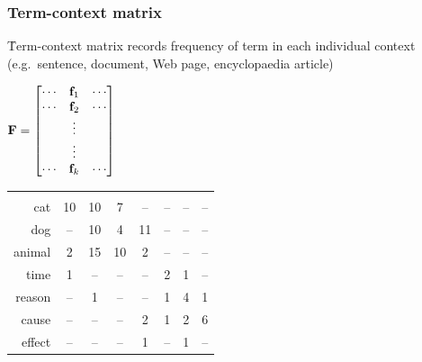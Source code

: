 \documentclass[t]{beamer} %
\begin{document}
\begin{frame}
  \frametitle{Term-context matrix}

  \h{Term-context matrix} records frequency of term in each individual context (e.g.\ sentence, document, Web page, encyclopaedia article)
  
  \gap[3]
  \begin{center}
  \(
  \mathbf{F} = 
  \begin{bmatrix}
    \cdots & \vf_1 & \cdots \\
    \cdots & \vf_2 & \cdots \\
    & \vdots & \\
    & \vdots & \\
    \cdots & \vf_k & \cdots \\
  \end{bmatrix}
  \)
  \hspace{5mm}
  \begin{small}
    \setlength{\arrayrulewidth}{1pt}
    \begin{tabular}[c]{r*{7}{|c}|}
      & 
      & 
      & 
      & 
      & 
      & 
      &  \\
      cat      &      10 &  10 &     7 &    -- &         -- &   -- &        -- \\
      dog      &      -- &  10 &     4 &    11 &         -- &   -- &        -- \\
      animal   &       2 &  15 &    10 &     2 &         -- &   -- &        -- \\
      time     &       1 &  -- &    -- &    -- &          2 &    1 &        -- \\
      reason   &      -- &   1 &    -- &    -- &          1 &    4 &         1 \\
      cause    &      -- &  -- &    -- &     2 &          1 &    2 &         6 \\
      effect   &      -- &  -- &    -- &     1 &         -- &    1 &        -- \\
    \end{tabular}
  \end{small}
  \end{center}

\end{frame}
\end{document}

